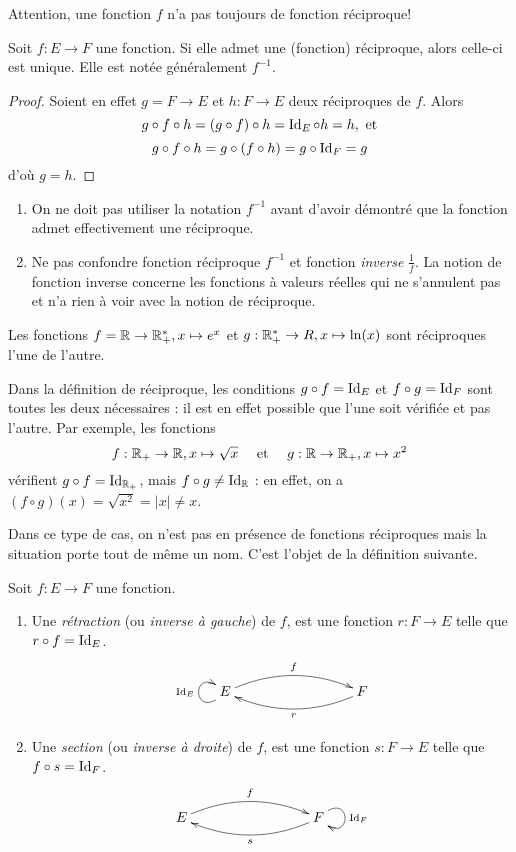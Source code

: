 Attention, une fonction $f$ n'a pas toujours de fonction réciproque!

\begin{proposition} Soit $f : E\to F$ une fonction. Si elle admet une (fonction) réciproque, alors celle-ci est unique. Elle est notée généralement $f^{-1}$.
\end{proposition}
\begin{proof}
Soient en effet $g = F\to E$ et $h : F \to E$ deux réciproques de $f$. Alors
\[
g\circ  f \circ h = (g\circ f) \circ h = \operatorname{Id}_E \circ h = h, \text{ et}
\]
\[
g\circ  f \circ h = g\circ (f \circ h) = g \circ \operatorname{Id}_F = g
\]
d'où $g=h$.
\end{proof}

\begin{attention}
\begin{enumerate}
\item On ne doit pas utiliser la notation $f^{-1}$ avant d'avoir démontré que la fonction admet effectivement une réciproque.
\item Ne pas confondre fonction réciproque $f^{-1}$ et fonction \emph{inverse} $\frac{1}{f}$. La notion de fonction inverse  concerne les fonctions à valeurs réelles qui ne s'annulent pas et n'a rien à voir avec la notion de réciproque.
\end{enumerate}
\end{attention}

\begin{exemple}
Les fonctions $f = \mathbb{R}\to \mathbb{R}_+^*, x\mapsto e^x$ et $g : \mathbb{R}_+^*\to R, x\mapsto \ln(x)$ sont réciproques l'une de l'autre.
\end{exemple}

\begin{attention}
Dans la définition de réciproque, les conditions $g\circ f = \operatorname{Id}_E$ et  $f\circ g = \operatorname{Id}_F$ sont toutes les deux nécessaires : il est en effet possible que l'une soit vérifiée et pas l'autre. Par exemple, les fonctions 
\[
f : \mathbb{R}_+\to \mathbb{R}, x\mapsto \sqrt x
\quad \text{ et }\quad
g : \mathbb{R}\to \mathbb{R}_+, x\mapsto x^2
\]
vérifient $g\circ f=\operatorname{Id}_{\mathbb{R}_+}$, mais $f\circ g \neq \operatorname{Id}_{\mathbb{R}}$ : en effet, on a $(f\circ g)(x)=\sqrt{x^2}=|x|\neq x$.

Dans ce type de cas, on n'est pas en présence de fonctions réciproques mais la situation porte tout de même un nom. C'est l'objet de la définition suivante.
\end{attention}

\begin{definition}
Soit $f : E\to F$ une fonction.
\begin{enumerate}
\item Une \emph{rétraction} (ou \emph{inverse à gauche}) de $f$, est une fonction $r:F\to E$ telle que $r\circ f = \operatorname{Id}_E$.
\[
\xymatrix{
 E \ar@(dl,ul)^{\Id_E} \ar@/^1pc/[rrr]^{f}
& & & 
\ar@/^1pc/[lll]^{r}  F 
}
\]
\item Une \emph{section} (ou \emph{inverse à droite}) de $f$, est une fonction $s:F\to E$ telle que $f \circ s = \operatorname{Id}_F$.
\[
\xymatrix{
 E  \ar@/^1pc/[rrr]^{f} 
& & & 
\ar@/^1pc/[lll]^{s}  F \ar@(ur,dr)^{\Id_F}
}
\]
\end{enumerate}
\end{definition}

